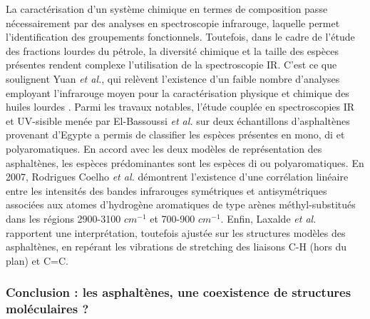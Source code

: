 La caractérisation d'un système chimique en termes de composition passe nécessairement par des analyses en spectroscopie infrarouge, laquelle permet l'identification des groupements fonctionnels. Toutefois, dans le cadre de l'étude des fractions lourdes du pétrole, la diversité chimique et la taille des espèces présentes rendent complexe l'utilisation de la spectroscopie IR. C'est ce que soulignent Yuan \textit{et al.}, qui relèvent l'existence d'un faible nombre d'analyses employant l'infrarouge moyen pour la caractérisation physique et chimique des huiles lourdes \cite{hongfu2006determination}. 
Parmi les travaux notables, l'étude couplée en spectroscopies IR et UV-sisible menée par El-Bassoussi \textit{et al.}\cite{el2010characterization} sur deux échantillons d'asphaltènes provenant d'Egypte a permis de classifier les espèces présentes en mono, di et polyaromatiques. En accord avec les deux modèles de représentation des asphaltènes, les espèces prédominantes sont les espèces di ou polyaromatiques. En 2007, Rodrigues Coelho \textit{et al.} \cite{coelho2007characterization} démontrent l'existence d'une corrélation linéaire entre les intensités des bandes infrarouges symétriques et antisymétriques associées aux atomes d'hydrogène aromatiques de type arènes méthyl-substitués dans les régions 2900-3100 $cm^{-1}$ et 700-900 $cm^{-1}$. Enfin, Laxalde \textit{et al.} \cite{laxalde2014combining} rapportent une interprétation, toutefois ajustée sur les structures modèles des asphaltènes, en repérant les vibrations de stretching des liaisons C-H (hors du plan) et C=C.

\bigskip

\subsubsection{Conclusion : les asphaltènes, une coexistence de structures moléculaires ?}

